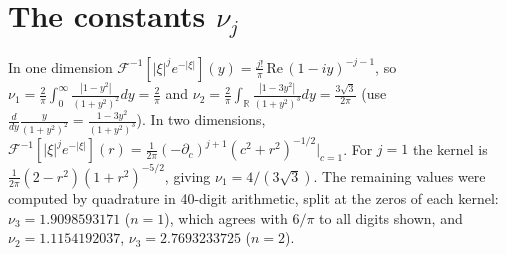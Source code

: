 \section{The constants $\nu_j$}\label{app:constants}
In one dimension $\mathcal F^{-1}[|\xi|^je^{-|\xi|}](y)=\frac{j!}{\pi}\,\mathrm{Re}\,(1-iy)^{-j-1}$, so
$\nu_1=\frac2\pi\int_0^\infty\frac{|1-y^2|}{(1+y^2)^2}dy=\frac2\pi$ and
$\nu_2=\frac2\pi\int_{\mathbb R}\frac{|1-3y^2|}{(1+y^2)^3}dy=\frac{3\sqrt3}{2\pi}$ (use
$\frac{d}{dy}\frac{y}{(1+y^2)^2}=\frac{1-3y^2}{(1+y^2)^3}$). In two dimensions,
$\mathcal F^{-1}[|\xi|^je^{-|\xi|}](r)=\frac1{2\pi}(-\partial_c)^{j+1}(c^2+r^2)^{-1/2}\big|_{c=1}$. For $j=1$
the kernel is $\frac1{2\pi}(2-r^2)(1+r^2)^{-5/2}$, giving $\nu_1=4/(3\sqrt3)$. The remaining values were
computed by quadrature in 40-digit arithmetic, split at the zeros of each kernel: $\nu_3=1.9098593171$ ($n=1$),
which agrees with $6/\pi$ to all digits shown, and $\nu_2=1.1154192037$, $\nu_3=2.7693233725$ ($n=2$).

